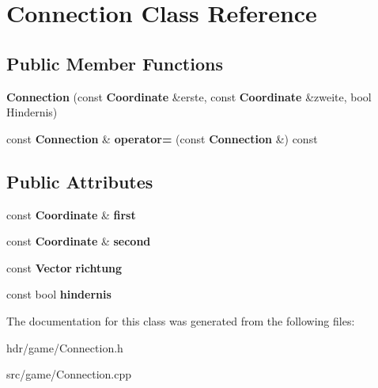 \section{Connection Class Reference}
\label{class_connection}
\subsection*{Public Member Functions}
\begin{DoxyCompactItemize}
\item 
{\bfseries Connection} (const {\bf Coordinate} \&erste, const {\bf Coordinate} \&zweite, bool Hindernis)\label{class_connection_acff2b5b881817a7b6e8d8173a1937640}

\item 
const {\bf Connection} \& {\bfseries operator=} (const {\bf Connection} \&) const \label{class_connection_a715ee5805776e50b971d5772267e4b46}

\end{DoxyCompactItemize}
\subsection*{Public Attributes}
\begin{DoxyCompactItemize}
\item 
const {\bf Coordinate} \& {\bfseries first}\label{class_connection_a1e4300e2849a2daebf4b1e4577ef1ea8}

\item 
const {\bf Coordinate} \& {\bfseries second}\label{class_connection_a968eaf3cec0996491425d8569e42416f}

\item 
const {\bf Vector} {\bfseries richtung}\label{class_connection_a34f34fdc3e693d504ad9d108c2e7ea02}

\item 
const bool {\bfseries hindernis}\label{class_connection_ae29f9a099c5d00919eb45123864fb7f4}

\end{DoxyCompactItemize}


The documentation for this class was generated from the following files\-:\begin{DoxyCompactItemize}
\item 
hdr/game/Connection.\-h\item 
src/game/Connection.\-cpp\end{DoxyCompactItemize}

